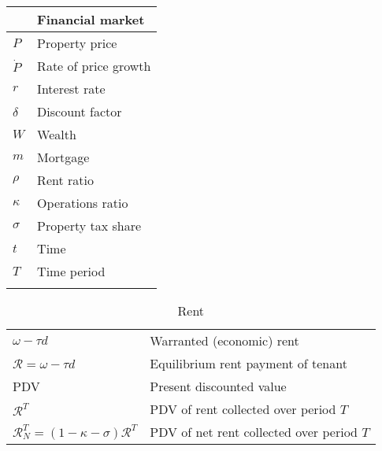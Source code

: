 \begin{longtable}{lp{10cm}}
\hline           & \textbf{Financial market} \\ \hline
$P$              &  Property price           \\ %
$\dot P$         &  Rate of price growth     \\
$r$              &  Interest rate            \\
$\delta$         &  Discount factor          \\
$W$              &  Wealth                   \\
$m$              &  Mortgage                 \\
$\rho$           &  Rent ratio               \\
$\kappa$         &  Operations ratio         \\
$\sigma$         &  Property tax share       \\ %
$t$              &  Time                     \\
$T$              &  Time period              \\
\hline
\color{black}
\end{longtable}  



\newpage

\begin{longtable}{lp{10cm}}
\caption{Rent}                                                           \\
\hline
$\omega-\tau d$               &  Warranted (economic) rent                \\
$\mathcal{R}=\omega-\tau d$   &  Equilibrium rent payment of tenant       \\
PDV                           &  Present discounted value                 \\  
$\mathcal{R}^T$               &  PDV of rent collected over period $T$    \\ 
$\mathcal{R}^T_N=(1-\kappa-\sigma)\mathcal{R}^T$  &  PDV of net rent collected over period $T$ \\
\hline
\end{longtable}


